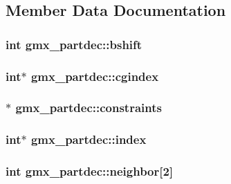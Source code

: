 \subsection{\-Member \-Data \-Documentation}
\hypertarget{structgmx__partdec_aaad9cecf7002a5b6c07d308f392a6138}{
\subsubsection[{bshift}]{\setlength{\rightskip}{0pt plus 5cm}int {\bf gmx\-\_\-partdec\-::bshift}}}\label{structgmx__partdec_aaad9cecf7002a5b6c07d308f392a6138}
\hypertarget{structgmx__partdec_a8f29f682a9e86bca410b71805f7c8b4f}{
\subsubsection[{cgindex}]{\setlength{\rightskip}{0pt plus 5cm}int$\ast$ {\bf gmx\-\_\-partdec\-::cgindex}}}\label{structgmx__partdec_a8f29f682a9e86bca410b71805f7c8b4f}
\hypertarget{structgmx__partdec_af2acfdbfb831056bf04bface1f333c3a}{
\subsubsection[{constraints}]{$\ast$ {\bf gmx\-\_\-partdec\-::constraints}}}\label{structgmx__partdec_af2acfdbfb831056bf04bface1f333c3a}
\hypertarget{structgmx__partdec_af9e7dc85b3d222e0ce03880ba697bd48}{
\subsubsection[{index}]{\setlength{\rightskip}{0pt plus 5cm}int$\ast$ {\bf gmx\-\_\-partdec\-::index}}}\label{structgmx__partdec_af9e7dc85b3d222e0ce03880ba697bd48}
\hypertarget{structgmx__partdec_a5144dace85deda9f7d7708127c6b9063}{
\subsubsection[{neighbor}]{\setlength{\rightskip}{0pt plus 5cm}int {\bf gmx\-\_\-partdec\-::neighbor}\mbox{[}2\mbox{]}}}\label{structgmx__partdec_a5144dace85deda9f7d7708127c6b9063}
